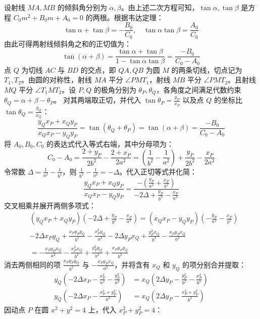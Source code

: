 \begin{solution}
设射线 $MA, MB$ 的倾斜角分别为 $\alpha, \beta$。由上述二次方程可知，$\tan\alpha, \tan\beta$ 是方程 $C_0 m^2 + B_0 m + A_0 = 0$ 的两根。根据韦达定理：
$$\tan\alpha + \tan\beta = -\frac{B_0}{C_0}, \quad \tan\alpha \tan\beta = \frac{A_0}{C_0}$$
由此可得两射线倾斜角之和的正切值为：
$$\tan(\alpha + \beta) = \frac{\tan\alpha + \tan\beta}{1 - \tan\alpha \tan\beta} = \frac{-B_0}{C_0 - A_0}$$
点 $Q$ 为切线 $AC$ 与 $BD$ 的交点，即 $QA, QB$ 为圆 $M$ 的两条切线，切点记为 $T_1, T_2$。由圆的对称性，射线 $MA$ 平分 $\angle P M T_1$，射线 $MB$ 平分 $\angle P M T_2$。且射线 $MQ$ 平分 $\angle T_1 M T_2$。设 $P, Q$ 的极角分别为 $\theta_P, \theta_Q$，各角度之间满足代数约束 $\theta_Q = \alpha + \beta - \theta_P$。
对其两端取正切，并代入 $\tan\theta_P = \frac{y_P}{x_P}$ 以及点 $Q$ 的坐标比 $\tan\theta_Q = \frac{y_Q}{x_Q}$：
$$\frac{y_Q x_P + x_Q y_P}{x_Q x_P - y_Q y_P} = \tan(\theta_Q + \theta_P) = \tan(\alpha + \beta) = \frac{-B_0}{C_0 - A_0}$$
将 $A_0, B_0, C_0$ 的表达式代入等式右端，其中分母项为：
$$C_0 - A_0 = \frac{2+y_P}{2b^2} - \frac{2+x_P}{2a^2} = \left(\frac{1}{b^2} - \frac{1}{a^2}\right) + \frac{y_P}{2b^2} - \frac{x_P}{2a^2}$$
令常数 $\Delta = \frac{1}{a^2} - \frac{1}{b^2}$，则 $\frac{1}{b^2} - \frac{1}{a^2} = -\Delta$。代入正切等式并化简：
$$\frac{y_Q x_P + x_Q y_P}{x_Q x_P - y_Q y_P} = \frac{-\left(\frac{y_P}{a^2} + \frac{x_P}{b^2}\right)}{-2\Delta + \frac{y_P}{b^2} - \frac{x_P}{a^2}}$$
交叉相乘并展开两侧多项式：
\begin{align*}
&(y_Q x_P + x_Q y_P) \left( -2\Delta + \frac{y_P}{b^2} - \frac{x_P}{a^2} \right) = (x_Q x_P - y_Q y_P) \left( -\frac{y_P}{a^2} - \frac{x_P}{b^2} \right) \\
&-2\Delta x_P y_Q + \frac{x_P y_P y_Q}{b^2} - \frac{x_P^2 y_Q}{a^2} - 2\Delta y_P x_Q + \frac{y_P^2 x_Q}{b^2} - \frac{x_P y_P x_Q}{a^2}\\
& = -\frac{x_P y_P x_Q}{a^2} - \frac{x_P^2 x_Q}{b^2} + \frac{y_P^2 y_Q}{a^2} + \frac{x_P y_P y_Q}{b^2}
\end{align*}
消去两侧相同的项 $\frac{x_P y_P y_Q}{b^2}$ 与 $-\frac{x_P y_P x_Q}{a^2}$，并将含有 $x_Q$ 和 $y_Q$ 的项分别合并提取：
\begin{align*}
y_Q \left( -2\Delta x_P - \frac{x_P^2}{a^2} - \frac{y_P^2}{a^2} \right) &= x_Q \left( 2\Delta y_P - \frac{y_P^2}{b^2} - \frac{x_P^2}{b^2} \right) \\
y_Q \left( -2\Delta x_P - \frac{x_P^2 + y_P^2}{a^2} \right) &= x_Q \left( 2\Delta y_P - \frac{x_P^2 + y_P^2}{b^2} \right)
\end{align*}
因动点 $P$ 在圆 $x^2+y^2=4$ 上，代入 $x_P^2 + y_P^2 = 4$：

\end{solution}
